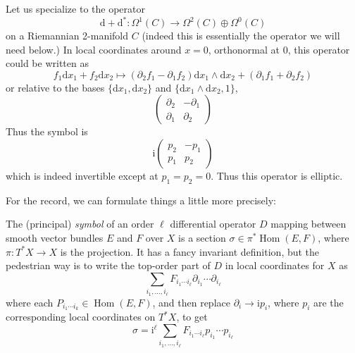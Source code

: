 \documentclass[12pt,letterpaper,reqno]{article}
\numberwithin{equation}{section}
\newcommand{\I}{{\mathrm i}}
\newcommand{\de}{\mathrm{d}}
\newcommand{\ti}[1]{\textit{#1}}
\DeclareMathOperator{\Hom}{Hom}
\begin{document}
Let us specialize to the operator
\begin{equation}
  \de + \de^*: \Omega^1(C) \to \Omega^2(C) \oplus \Omega^0(C)
\end{equation}
on a Riemannian 2-manifold $C$ (indeed this is essentially the 
operator we will need below.)
In local coordinates around $x = 0$, orthonormal at $0$, 
this operator could be written as
\begin{equation}
 f_1 \de x_1 + f_2 \de x_2 \mapsto (\partial_2 f_1 - \partial_1 f_2) \de x_1 \wedge \de x_2 + (\partial_1 f_1 + \partial_2 f_2)
\end{equation}
or relative to the bases $\{\de x_1, \de x_2\}$ and $\{\de x_1 \wedge \de x_2, 1\}$,
\begin{equation}
  \begin{pmatrix} \partial_2 & -\partial_1 \\ \partial_1 & \partial_2 \end{pmatrix}
\end{equation}
Thus the symbol is
\begin{equation}
  \I \begin{pmatrix} p_2 & -p_1 \\ p_1 & p_2 \end{pmatrix}
\end{equation}
which is indeed invertible except at $p_1 = p_2 = 0$.
Thus this operator is elliptic.

For the record, we can formulate things a little more precisely:
\begin{defn} \label{def:symbol} 
The (principal) 
\ti{symbol} of an order $\ell$ differential operator $D$ mapping 
between smooth vector bundles $E$ and $F$ over $X$ is a section
$\sigma \in \pi^* \Hom(E,F)$, where $\pi: T^* X \to X$ is the projection.
It has a fancy invariant definition, but the pedestrian way is
to write the top-order part of $D$ in local coordinates for $X$ as
\begin{equation}
  \sum_{i_1, \dots, i_\ell} {F_{i_1 \cdots i_\ell}} \partial_{i_1} \cdots \partial_{i_\ell}
\end{equation}
where each $P_{i_1 \cdots i_k} \in \Hom(E,F)$, and then replace
$\partial_{i} \to \I p_i$, where $p_i$ are the corresponding local
coordinates on $T^* X$, to get
\begin{equation}
  \sigma = \I^\ell \sum_{i_1, \dots, i_\ell} {F_{i_1 \cdots i_\ell}} p_{i_1} \cdots p_{i_\ell}
\end{equation}
\end{defn}
\end{document}

